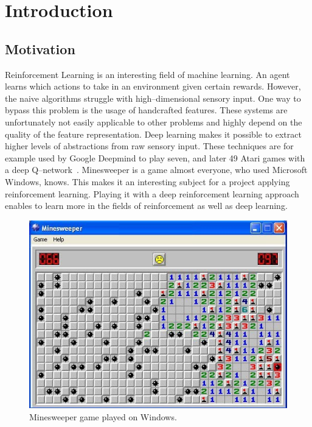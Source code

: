\chapter{Introduction}

\section{Motivation}
Reinforcement Learning is an interesting field of machine learning. An agent learns which
actions to take in an environment given certain rewards. However, the naive algorithms
struggle with high--dimensional sensory input. One way to bypass this problem is the
usage of handcrafted features. These systems are unfortunately not easily applicable
to other problems and highly depend on the quality of the feature representation. Deep
learning makes it possible to extract higher levels of abstractions from raw sensory input.
These techniques are for example used by Google Deepmind to play seven, and later 49 Atari games with a deep Q--network~\cite{mnih2013playing, mnih2015human}.
Minesweeper is a game almost everyone, who used Microsoft Windows, knows. 
This makes it an interesting subject for a project applying reinforcement learning. Playing
it with a deep reinforcement learning approach enables to learn more in the fields of reinforcement as well as deep learning.

\begin{figure}
	\centering
	\includegraphics[scale=0.8]{images/img_26041_minesweeper_large.jpg}
	\caption{Minesweeper game played on Windows.}
	\label{fig:minesweeper}
\end{figure}

